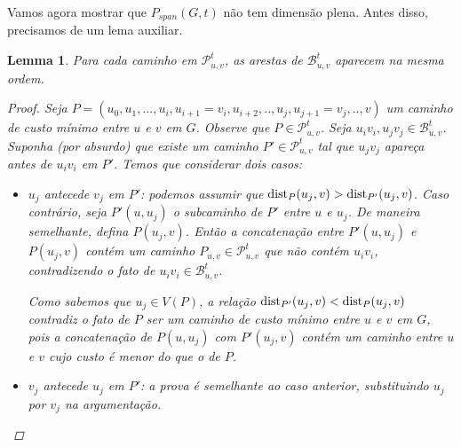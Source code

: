 \documentclass[11pt,reqno]{amsart}
\newcommand{\spanPath}{\mathcal{P}}
\newcommand{\spanBridge}{\mathcal{B}}
\newcommand{\Pathuv}{\spanPath_{u,v}^{t}}
\newcommand{\Bridgeuv}{\spanBridge_{u,v}^{t}}
\newcommand{\dist}{{\rm dist}}
\newtheorem{lema}{Lemma}
\begin{document}
Vamos agora mostrar que $P_{span}(G,t)$ não tem dimensão plena. Antes disso, 
precisamos de um lema auxiliar.

\begin{lema}
\label{lem:ordem_pontes}
Para cada caminho em $\Pathuv$, as arestas de 
$\Bridgeuv$ aparecem na mesma ordem.

\begin{proof}
Seja $P = (u_0, u_1, ..., u_i, u_{i+1} = v_i, u_{i+2}, .., u_j, u_{j+1} = v_j, .., v)$ 
um caminho de custo mínimo entre $u$ e $v$ em $G$. Observe que $P \in \Pathuv$.  Seja $u_iv_i,u_jv_j \in \Bridgeuv$. Suponha (por absurdo) que 
existe um caminho $P' \in \Pathuv$ tal que $u_jv_j$ apareça antes de $u_iv_i$ em 
$P'$. Temos que considerar dois casos: 

\begin{itemize}
\item $u_j$ antecede $v_j$ em $P'$: podemos assumir que 
$\dist_{P}(u_j,v) > \dist_{P'}(u_j,v)$. Caso contrário, seja $P'(u,u_j)$ o 
subcaminho de $P'$ entre $u$ e $u_j$. De maneira semelhante, defina $P(u_j,v)$. 
Então a concatenação entre $P'(u,u_j)$ e $P(u_j,v)$ contém um caminho 
$P_{u,v} \in \Pathuv$ que não contém $u_iv_i$, contradizendo o fato de 
$u_iv_i \in \Bridgeuv$.
 

Como sabemos que $u_j \in V(P)$, a relação 
$\dist_{P'}(u_j,v) < \dist_{P}(u_j,v)$ contradiz o fato de $P$ ser um caminho 
de custo mínimo entre $u$ e $v$ em $G$, pois a concatenação de $P(u,u_j)$ com 
$P'(u_j,v)$ contém um caminho entre $u$ e $v$ cujo custo é menor do que o de $P$.

\item $v_j$ antecede $u_j$ em $P'$: a prova é semelhante ao caso anterior, 
substituindo $u_j$ por $v_j$ na argumentação.
\end{itemize}
\end{proof}
\end{lema}

\end{document}
